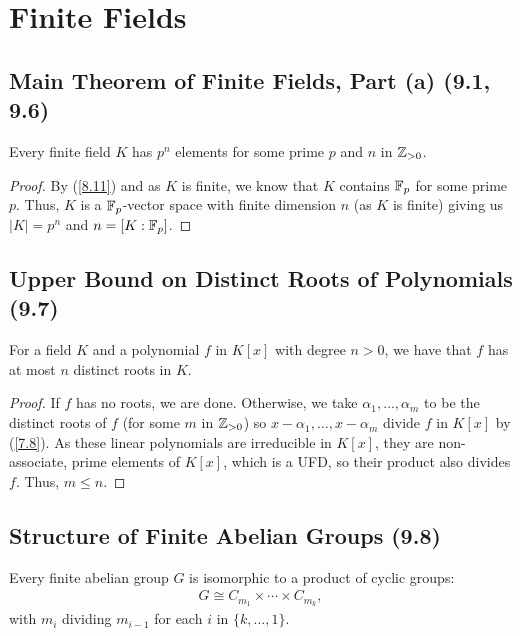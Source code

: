 \section{Finite Fields}

\subsection{Main Theorem of Finite Fields, Part (a) (9.1, 9.6)} \label{9.1a} \label{9.6}

Every finite field $K$ has $p^n$ elements for some prime $p$ and $n$ in $\mathbb{Z}_{> 0}$.

\begin{proof}
    By (\ref{8.11}) and as $K$ is finite, we know that $K$ contains $\mathbb{F}_p$ for some 
    prime $p$. Thus, $K$ is a $\mathbb{F}_p$-vector space with finite dimension $n$ (as $K$ is
    finite) giving us $|K| = p^n$ and $n = [K : \mathbb{F}_p]$.
\end{proof}

\subsection{Upper Bound on Distinct Roots of Polynomials (9.7)} \label{9.7}

For a field $K$ and a polynomial $f$ in $K[x]$ with degree $n > 0$, we have that
$f$ has at most $n$ distinct roots in $K$.

\begin{proof}
    If $f$ has no roots, we are done. Otherwise, we take $\alpha_1, \ldots, \alpha_m$ 
    to be the distinct roots of $f$ (for some $m$ in $\mathbb{Z}_{>0}$) so
    $x - \alpha_1, \ldots, x - \alpha_m$ divide $f$ in $K[x]$ by (\ref{7.8}).
    As these linear polynomials are irreducible in $K[x]$, they are non-associate,
    prime elements of $K[x]$, which is a UFD, so their product also divides $f$.
    Thus, $m \leq n$.
\end{proof}

\subsection{Structure of Finite Abelian Groups (9.8)} \label{9.8}

Every finite abelian group $G$ is isomorphic to a product of cyclic groups: \begin{align*}
    G \cong C_{m_1} \times \cdots \times C_{m_k},
\end{align*} with $m_i$ dividing $m_{i - 1}$ for each $i$ in $\{k, \ldots, 1\}$.

